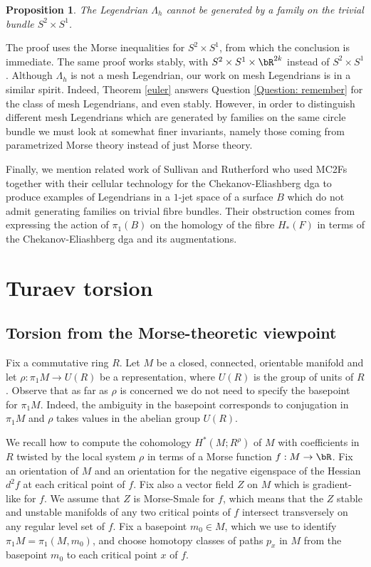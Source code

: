 \documentclass[JEP,XML,SOM,Unicode,NoFloatCountersInSection]{cedram}
\theoremstyle{plain}
\newtheorem{proposition}[theorem]{Proposition}
\theoremstyle{definition}
\begin{document}
\begin{proposition}
The Legendrian $\Lambda_h$ cannot be generated by a family on the trivial bundle $S^2 \times S^1$.
\end{proposition}

The proof uses the Morse inequalities for $S^2 \times S^1$, from which the conclusion is immediate. The same proof works stably, with $S^2 \times S^1 \times \bR^{2k}$ instead of $S^2 \times S^1$. Although $\Lambda_h$ is not a mesh Legendrian, our work on mesh Legendrians is in a similar spirit. Indeed, Theorem \ref{euler} answers Question \ref{Question: remember} for the class of mesh Legendrians, and even stably. However, in order to distinguish different mesh Legendrians which are generated by families on the same circle bundle we must look at somewhat finer invariants, namely those coming from parametrized Morse theory instead of just Morse theory.

Finally, we mention related work of Sullivan and Rutherford \cite{RS18} who used MC2Fs together with their cellular technology for the Chekanov-Eliashberg dga to produce examples of Legendrians in a $1$-jet space of a surface $B$ which do not admit generating families on trivial fibre bundles. Their obstruction comes from expressing the action of $\pi_1(B)$ on the homology of the fibre $H_*(F)$ in terms of the Chekanov-Eliashberg dga and its augmentations.

\section{Turaev torsion}\label{Section: turaev torsion}

\subsection{Torsion from the Morse-theoretic viewpoint}\label{reidemeistertorsion}

Fix a commutative ring $R$. Let $M$ be a closed, connected, orientable manifold and let $\rho: \pi_1M \to U(R)$ be a representation, where $U(R)$ is the group of units of $R$. Observe that as far as $\rho$ is concerned we do not need to specify the basepoint for $\pi_1M$. Indeed, the ambiguity in the basepoint corresponds to conjugation in $\pi_1 M$ and $\rho$ takes values in the abelian group $U(R)$.

We recall how to compute the cohomology $H^*(M; R^\rho)$ of $M$ with coefficients in~$R$ twisted by the local system $\rho$ in terms of a Morse function $f:M \to \bR$. Fix an orientation of $M$ and an orientation for the negative eigenspace of the Hessian $d^2f$ at each critical point of $f$. Fix also a vector field $Z$ on $M$ which is gradient-like for $f$. We assume that $Z$ is Morse-Smale for $f$, which means that the $Z$ stable and unstable manifolds of any two critical points of $f$ intersect transversely on any regular level set of $f$. Fix a basepoint $m_0 \in M$, which we use to identify $\pi_1M=\pi_1(M,m_0)$, and choose homotopy classes of paths $p_x$ in $M$ from the basepoint $m_0$ to each critical point $x$ of $f$.
\end{document}

